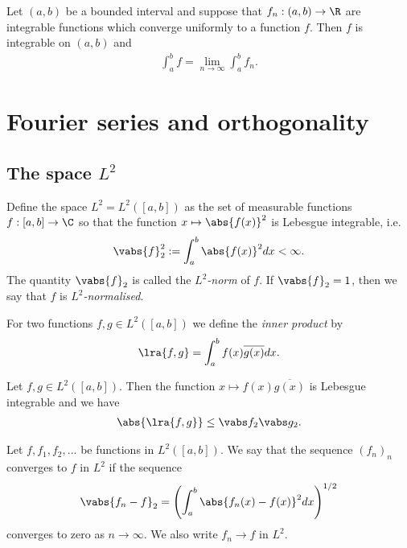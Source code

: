 \documentclass{article}
\begin{document}
\begin{theorem}[Notes 4.13]
    Let $(a,b)$ be a bounded interval and suppose that $f_n:(a,b)\to\R$ are integrable functions 
    which converge uniformly to a function $f$. Then $f$ is integrable on $(a,b)$ and 
    \begin{align*}
        \int_a^b f = \lim_{n\to\infty} \int_a^b f_n.
    \end{align*}
\end{theorem}

\section{Fourier series and orthogonality}

\subsection{The space $L^2$}

\begin{definition}[Notes 5.1]
    Define the space $L^2=L^2([a,b])$ as the set of measurable functions $f:[a,b]\to\C$
    so that the function $x\mapsto \abs{f(x)}^2$ is Lebesgue integrable, i.e. 
    \begin{align*}
       \vabs{f}_2^2 := \int_a^b \abs{f(x)}^2 dx < \infty.
    \end{align*}
    The quantity $\vabs{f}_2$ is called the \emph{$L^2$-norm} of $f$. If $\vabs{f}_2=1$,
    then we say that $f$ is \emph{$L^2$-normalised}.
\end{definition}

\begin{definition}[Notes 5.2]
    For two functions $f,g\in L^2([a,b])$ we define the \emph{inner product} by 
    \begin{align*}
        \lra{f,g} = \int_a^b f(x)\overline{g(x)}dx.
    \end{align*}
\end{definition}

\begin{theorem}
    Let $f,g\in L^2([a,b])$. Then the function $x\mapsto f(x)\overline{g(x)}$ is Lebesgue
    integrable and we have
    \begin{align*}
        \abs{\lra{f,g}}\leq \vabs f_2\vabs g_2.
    \end{align*} 
\end{theorem}

\begin{definition}[Notes 5.3]
    Let $f,f_1,f_2,...$ be functions in $L^2([a,b])$. We say that the sequence $(f_n)_n$ converges 
    to $f$ in $L^2$ if the sequence 
    \begin{align*}
        \vabs{f_n - f}_2 = \left(\int_a^b \abs{f_n(x)-f(x)}^2dx\right)^{1/2}
    \end{align*}
    converges to zero as $n\to\infty$. We also write $f_n\to f$ in $L^2$.
\end{definition}
\end{document}
